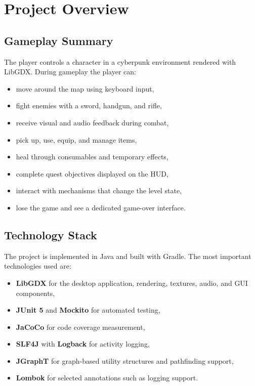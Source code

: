 \documentclass[12pt]{extarticle}
\begin{document}
\section{Project Overview}
\subsection{Gameplay Summary}
The player controls a character in a cyberpunk environment rendered with LibGDX. During gameplay the player can:
\begin{itemize}[leftmargin=1.5em]
    \item move around the map using keyboard input,
    \item fight enemies with a sword, handgun, and rifle,
    \item receive visual and audio feedback during combat,
    \item pick up, use, equip, and manage items,
    \item heal through consumables and temporary effects,
    \item complete quest objectives displayed on the HUD,
    \item interact with mechanisms that change the level state,
    \item lose the game and see a dedicated game-over interface.
\end{itemize}

\subsection{Technology Stack}
The project is implemented in Java and built with Gradle. The most important technologies used are:
\begin{itemize}[leftmargin=1.5em]
    \item \textbf{LibGDX} for the desktop application, rendering, textures, audio, and GUI components,
    \item \textbf{JUnit 5} and \textbf{Mockito} for automated testing,
    \item \textbf{JaCoCo} for code coverage measurement,
    \item \textbf{SLF4J} with \textbf{Logback} for activity logging,
    \item \textbf{JGraphT} for graph-based utility structures and pathfinding support,
    \item \textbf{Lombok} for selected annotations such as logging support.
\end{itemize}
\end{document}
